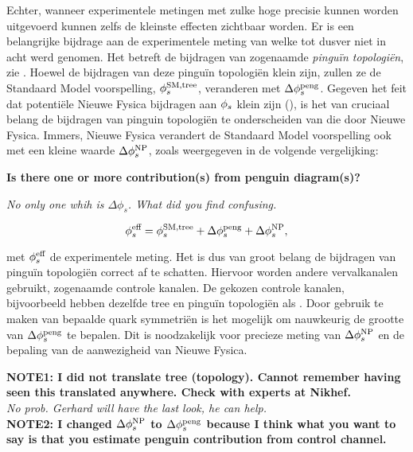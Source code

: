 Echter, wanneer experimentele metingen met zulke hoge precisie kunnen worden uitgevoerd
kunnen zelfs de kleinste effecten zichtbaar worden. Er is een belangrijke bijdrage aan de
experimentele meting van \phis welke tot dusver niet in acht werd genomen. Het betreft de
bijdragen van zogenaamde {\it pingu\"in topologi\"en}, zie  .
Hoewel de bijdragen van deze pingu\"in topologi\"en klein zijn, zullen ze de Standaard Model
voorspelling, $\phi_{s}^{\tiny \text{SM,tree}}$, veranderen met $\Delta\phi_{s}^{\tiny\text{peng}}$. Gegeven het
feit dat potenti\"ele Nieuwe Fysica bijdragen aan $\phi_{s}$ klein zijn (),
is het van cruciaal belang de bijdragen van pinguin topologi\"en te onderscheiden van die door Nieuwe Fysica.
Immers, Nieuwe Fysica verandert de Standaard Model voorspelling ook met een kleine waarde
 $\Delta\phi_{s}^{\tiny \text{NP}}$, zoals weergegeven in de volgende vergelijking:

\textbf{Is there one or more contribution(s) from penguin diagram(s)?}

{\color{green}\it No only one whih is $\Delta \phi_s$. What did you find confusing.}

\begin{equation}
\centering
 \phis^{\text {eff}} = \phis^{\tiny \text{SM,tree}} + \Delta\phiS{peng} + \Delta\phis^{\tiny \text{NP}},
 \label{app_phis_sm_peng}
\end{equation}


\noindent met $\phi_{s}^{\text {eff}}$ de experimentele \phis meting. Het is dus van groot belang de
bijdragen van pingu\"in topologi\"en correct af te schatten. Hiervoor worden andere \Bs vervalkanalen gebruikt,
 zogenaamde controle kanalen. De gekozen controle kanalen, bijvoorbeeld \BsJpsiKst hebben dezelfde tree en
  pingu\"in topologi\"en als \BsJpsiPhi. Door gebruik te maken van bepaalde quark symmetri\"en is het
  mogelijk om nauwkeurig de grootte van $\Delta\phi_{s}^{\tiny\text{peng}}$ te bepalen. Dit is noodzakelijk voor precieze
  meting van $\Delta\phi_{s}^{\tiny \text{NP}}$ en de bepaling van de aanwezigheid van Nieuwe Fysica.

\textbf{NOTE1: I did not translate tree (topology). Cannot remember having seen this translated anywhere.
Check with experts at Nikhef. }\\
{\color{green}\it No prob. Gerhard will have the last look, he can help. }\\

\textbf{NOTE2: I changed $\Delta\phi_{s}^{\tiny \text{NP}}$  to $\Delta\phi_{s}^{\tiny\text{peng}}$ because I think what
you want to say is that you estimate penguin contribution from control channel. }\\

